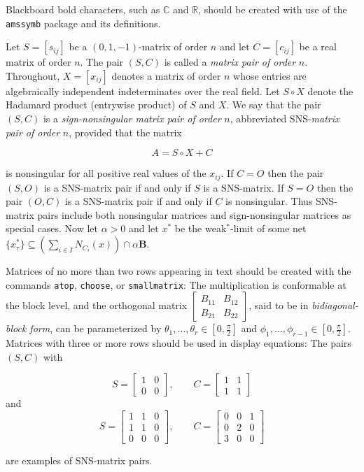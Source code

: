\documentclass[final,leqno,onetabnum]{siamltex0315}
\begin{document}
Blackboard bold characters, such as $\mathbb{C}$ and $\mathbb{R}$, should be created with use of the {\tt amssymb} package and its definitions.
 
Let $S=[s_{ij}]$ be a $(0,1,-1)$-matrix of order $n$ and
let $C=[c_{ij}]$ be a real matrix of order $n$. The pair
$(S,C)$ is called a {\em matrix pair of order} $n$.
Throughout, $X=[x_{ij}]$ denotes a matrix of order $n$
whose entries are algebraically independent indeterminates
over the real field. Let $S\circ X$ denote the Hadamard
product (entrywise product) of $S$ and $X$. We say that the
pair $(S,C)$ is a {\em sign-nonsingular matrix pair of
order} $n$, abbreviated SNS-{\em matrix pair of order} $n$,
provided that the matrix \begin{linenomath*}\[A=S\circ X+C\]\end{linenomath*} is nonsingular
for all positive real values of the $x_{ij}$.  If $C=O$
then the pair $(S,O)$ is a SNS-matrix pair if and only if
$S$ is a SNS-matrix.  If $S=O$ then the pair $(O,C)$ is a
SNS-matrix pair if and only if $C$ is nonsingular. Thus
SNS-matrix pairs include both nonsingular matrices and
sign-nonsingular matrices as special cases.   Now  let $\alpha>0$ and let $x^*$ be the weak$^*$-limit of some net $\{x_\tau^*\}
  \subseteq (\sum_{i\in I}N_{C_i}(x))\cap\alpha\mathbf{B}$.
 
Matrices of no more than two rows appearing in text should be created with the commands {\tt atop}, 
{\tt choose}, or {\tt smallmatrix}: The multiplication is conformable at the block level, and the orthogonal
matrix $[ \begin{smallmatrix} B_{11} & B_{12} \\ B_{21} & B_{22} \end{smallmatrix} ]$,
said to be in \emph{bidiagonal-block form}, can be parameterized by
$\theta_{1},\dots,\theta_{r}\in[0,\frac{\pi}{2}]$ and $\phi_{1},\dots,\phi_{r-1}\in[0,\frac{\pi}{2}]$.  Matrices with three or more
rows should be used in display equations: The pairs $(S,C)$ with
\begin{linenomath*}
\[S=\left[\begin{array}{cc}1&0\\0&0\end{array}\right],\qquad 
C=\left[\begin{array}{cc}1&1\\1&1\end{array}\right]\] and 
\[S=\left[\begin{array}{ccc}1&1&0\\1&1&0\\0&0&0\end{array}\right],\qquad 
C=\left[\begin{array}{ccc}0&0&1\\0&2&0\\
3&0&0\end{array}\right]\]
\end{linenomath*}
are examples of SNS-matrix pairs.  
\end{document}
